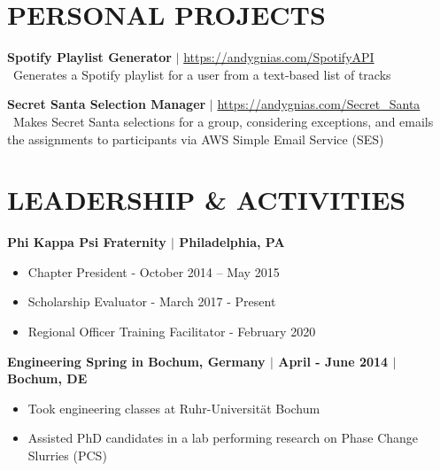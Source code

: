 \documentclass[line,resmargin,11pt]{res}
\begin{document}
\begin{resume}
\section{PERSONAL PROJECTS}

\textbf{Spotify Playlist Generator} $|$ \url{https://andygnias.com/SpotifyAPI} \\
\textbullet\ Generates a Spotify playlist for a user from a text-based list of tracks

\textbf{Secret Santa Selection Manager} $|$ \url{https://andygnias.com/Secret_Santa} \\
\textbullet\ Makes Secret Santa selections for a group, considering exceptions, and emails the assignments to participants via AWS Simple Email Service (SES)

				
\section{LEADERSHIP \& ACTIVITIES}
\textbf{Phi Kappa Psi Fraternity $|$ Philadelphia, PA} \\
	\begin{itemize} \itemsep -2pt
		\item  Chapter President - October 2014 – May 2015
		\item Scholarship Evaluator - March 2017 - Present
		\item  Regional Officer Training Facilitator - February 2020
	\end{itemize}
				
\textbf{Engineering Spring in Bochum, Germany  $|$ April - June 2014 $|$ Bochum, DE} \\
	\begin{itemize} \itemsep -2pt
		\item  Took engineering classes at Ruhr-Universität Bochum
		\item Assisted PhD candidates in a lab performing research on Phase Change Slurries (PCS)
	\end{itemize}

\end{resume}
\end{document}
